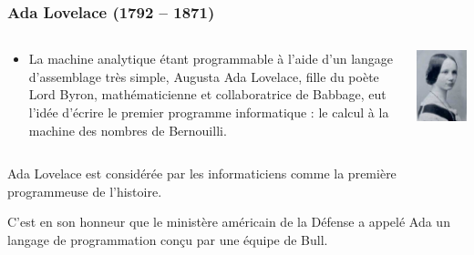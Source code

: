 \documentclass[utf8,10pt]{beamer}
\begin{document}
\begin{frame}
    \frametitle{Ada Lovelace (1792 -- 1871)}
    
    \begin{columns}
    \begin{column}{0.6\textwidth}
     \begin{itemize}
        \item La machine analytique étant programmable à l'aide d'un langage d'assemblage très simple,
        Augusta Ada Lovelace, fille du poète Lord Byron, mathématicienne et collaboratrice de Babbage, 
        eut l'idée d'écrire
        le premier programme informatique : le calcul à la machine des nombres de Bernouilli.
     \end{itemize}
    \end{column}
    
    \hfill
    
    \begin{column}{0.4\textwidth}
        \includegraphics[scale=0.45]{./images/Lovelace}
    \end{column}
    \end{columns}

    \begin{block}{}
        Ada Lovelace est considérée par les informaticiens comme la première programmeuse de l'histoire.
    \end{block}
    
    \vfill
    
    C'est en son 
    honneur que le ministère américain de la Défense a appelé Ada un langage de programmation conçu par
    une équipe de Bull.
    
    \hfill \hyperlink{http://fr.wikipedia.org/wiki/Ada_Lovelace}{}

\end{frame}
\end{document}
